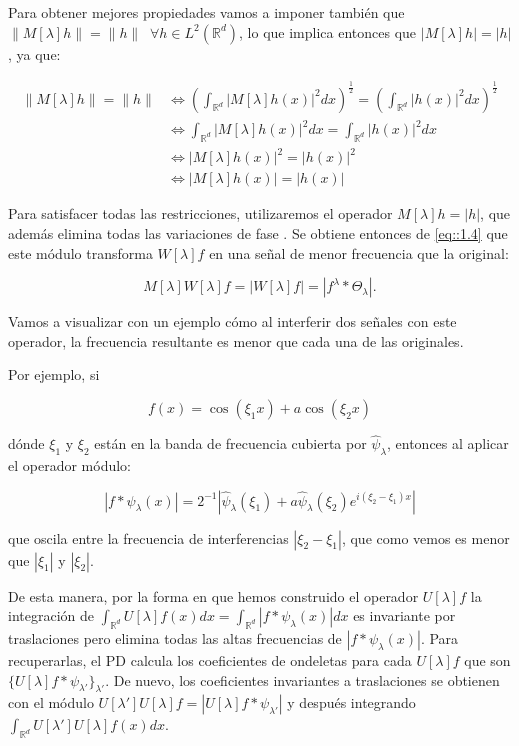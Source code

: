 \medskip

\noindent Para obtener mejores propiedades vamos a imponer también que $\|M[\lambda]h\|=\|h\| \; \; \forall h \in L^2(\mathbb{R}^d)$, lo que implica entonces que $|M[\lambda]h|=|h|$, ya que:  

\begin{align*}
  \|M[\lambda]h\|=\|h\| &\iff \left(\int_{\mathbb{R}^d} |M[\lambda]h (x)|^2 dx \right)^{\frac{1}{2}} =\left(\int_{\mathbb{R}^d} |h(x)|^2 dx \right)^{\frac{1}{2}} \\
  & \iff \int_{\mathbb{R}^d} |M[\lambda]h (x)|^2 dx=\int_{\mathbb{R}^d} |h(x)|^2 dx \\
  & \iff |M[\lambda]h (x)|^2=|h(x)|^2 \\
  & \iff |M[\lambda]h (x)|=|h(x)|
\end{align*}

\medskip

\noindent Para satisfacer todas las restricciones, utilizaremos el operador $M[\lambda]h=|h|$, que además elimina todas las variaciones de fase \cite{bruna2013invariant}. Se obtiene entonces de \eqref{eq::1.4} que este módulo transforma $W[\lambda]f$ en una señal de menor frecuencia que la original:

$$M[\lambda]W[\lambda]f=|W[\lambda]f|=|f^\lambda \ast \Theta_\lambda|.$$

\noindent Vamos a visualizar con un ejemplo cómo al interferir dos señales con este operador, la frecuencia resultante es menor que cada una de las originales. 

\medskip

\noindent Por ejemplo, si 

$$f(x)=\cos(\xi_1 x)+a\cos(\xi_2 x)$$

\noindent dónde $\xi_1$ y $\xi_2$ están en la banda de frecuencia cubierta por $\widehat{\psi}_\lambda$, entonces al aplicar el operador módulo: 

$$|f \ast \psi_\lambda (x) |=2^{-1} |\widehat{\psi}_\lambda(\xi_1)+a\widehat{\psi}_\lambda(\xi_2)e^{i(\xi_2-\xi_1)x}|$$

\noindent que oscila entre la frecuencia de interferencias $|\xi_2-\xi_1|$, que como vemos es menor que $|\xi_1|$ y $|\xi_2|$.

\medskip

\noindent De esta manera, por la forma en que hemos construido el operador $U[\lambda] f$ la integración de $\int_{\mathbb{R}^d}U[\lambda]f(x) dx= \int_{\mathbb{R}^d} | f \ast \psi_\lambda(x)|dx$ es invariante por traslaciones pero elimina todas las altas frecuencias de $|f \ast \psi_\lambda(x)|$. Para recuperarlas, el PD calcula los coeficientes de ondeletas para cada $U[\lambda]f$ que son $\lbrace U[\lambda]f \ast \psi_{\lambda'}\rbrace_{\lambda'}$. De nuevo, los coeficientes invariantes a traslaciones se obtienen con el módulo $U[\lambda']U[\lambda]f=|U[\lambda]f \ast \psi_{\lambda'}|$ y después integrando $\int_{\mathbb{R}^d} U[\lambda']U[\lambda]f(x) dx$. 

